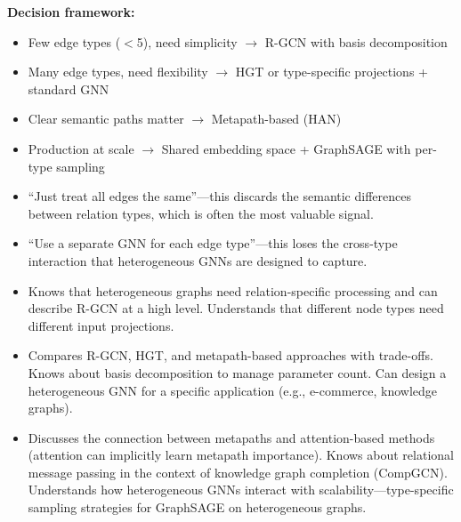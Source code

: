 \begin{interviewq}
\textbf{Decision framework:}
\begin{itemize}
    \item Few edge types ($<$5), need simplicity $\to$ R-GCN with basis decomposition
    \item Many edge types, need flexibility $\to$ HGT or type-specific projections + standard GNN
    \item Clear semantic paths matter $\to$ Metapath-based (HAN)
    \item Production at scale $\to$ Shared embedding space + GraphSAGE with per-type sampling
\end{itemize}

\redflags
\begin{itemize}
    \item ``Just treat all edges the same''---this discards the semantic differences between relation types, which is often the most valuable signal.
    \item ``Use a separate GNN for each edge type''---this loses the cross-type interaction that heterogeneous GNNs are designed to capture.
\end{itemize}


\goodgreat
\begin{itemize}
    \item {} Knows that heterogeneous graphs need relation-specific processing and can describe R-GCN at a high level. Understands that different node types need different input projections.
    \item {} Compares R-GCN, HGT, and metapath-based approaches with trade-offs. Knows about basis decomposition to manage parameter count. Can design a heterogeneous GNN for a specific application (e.g., e-commerce, knowledge graphs).
    \item {} Discusses the connection between metapaths and attention-based methods (attention can implicitly learn metapath importance). Knows about relational message passing in the context of knowledge graph completion (CompGCN). Understands how heterogeneous GNNs interact with scalability---type-specific sampling strategies for GraphSAGE on heterogeneous graphs.
\end{itemize}

\end{interviewq}
